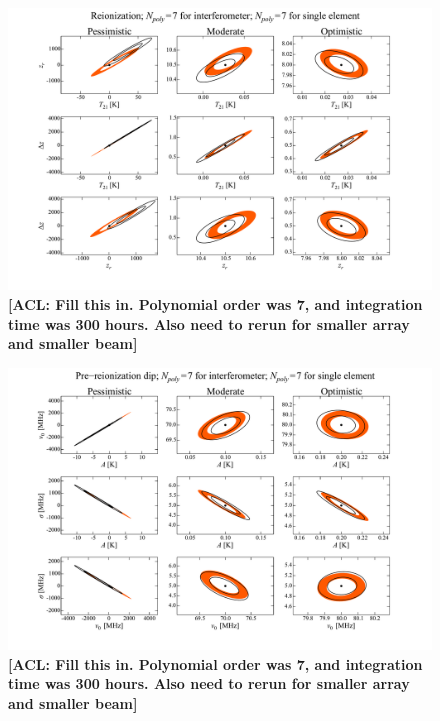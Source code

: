 \documentclass[twolcolumn,apj,iop,numberedappendix]{emulateapj}
\newcommand{\acl}[1]{{\color{red} \textbf{[ACL:  #1]}}}
\begin{document}
\begin{figure}[t]
	\centering
	\includegraphics[width=1.00\textwidth,trim=3cm 2cm 3cm 0cm,clip]{figures/reionContoursPoly7Poly7.pdf}
	\caption{\acl{Fill this in. Polynomial order was 7, and integration time was 300 hours. Also need to rerun for smaller array and smaller beam}}
	\label{fig:reionContoursPoly7Poly7}
\end{figure}


\begin{figure}[t]
	\centering
	\includegraphics[width=1.00\textwidth,trim=3cm 2cm 3cm 0cm,clip]{figures/dipContoursPoly7Poly7.pdf}
	\caption{\acl{Fill this in. Polynomial order was 7, and integration time was 300 hours. Also need to rerun for smaller array and smaller beam}}
	\label{fig:dipContoursPoly7Poly7}
\end{figure}
\end{document}
